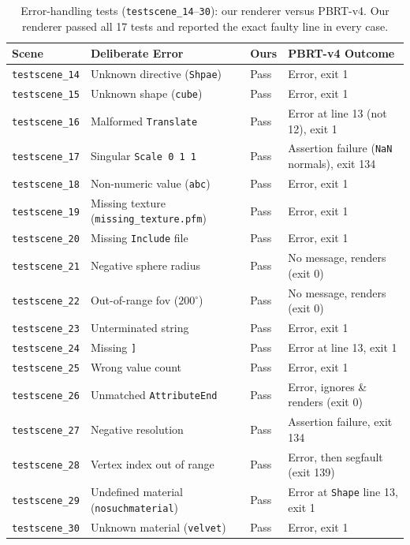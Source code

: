 \documentclass{article}
\begin{document}
\begin{table}[htbp]
\centering
\caption{Error-handling tests (\texttt{testscene\_14}--\texttt{30}): our renderer versus PBRT-v4. Our renderer passed all 17 tests and reported the exact faulty line in every case.}
\label{tab:error_tests}
\footnotesize
\renewcommand{\arraystretch}{1.12}
\setlength{\tabcolsep}{4pt}
\begin{tabularx}{\textwidth}{@{}l >{\hsize}L l >{\hsize}L@{}}
\toprule
\textbf{Scene} & \textbf{Deliberate Error} & \textbf{Ours} & \textbf{PBRT-v4 Outcome} \\
\midrule
\texttt{testscene\_14} & Unknown directive (\texttt{Shpae}) & Pass & Error, exit 1 \\
\texttt{testscene\_15} & Unknown shape (\texttt{cube}) & Pass & Error, exit 1 \\
\texttt{testscene\_16} & Malformed \texttt{Translate} & Pass & Error at line 13 (not 12), exit 1 \\
\texttt{testscene\_17} & Singular \texttt{Scale 0 1 1} & Pass & Assertion failure (\texttt{NaN} normals), exit 134 \\
\texttt{testscene\_18} & Non-numeric value (\texttt{abc}) & Pass & Error, exit 1 \\
\texttt{testscene\_19} & Missing texture (\texttt{missing\_texture.pfm}) & Pass & Error, exit 1 \\
\texttt{testscene\_20} & Missing \texttt{Include} file & Pass & Error, exit 1 \\
\texttt{testscene\_21} & Negative sphere radius & Pass & No message, renders (exit 0) \\
\texttt{testscene\_22} & Out-of-range fov ($200^\circ$) & Pass & No message, renders (exit 0) \\
\texttt{testscene\_23} & Unterminated string & Pass & Error, exit 1 \\
\texttt{testscene\_24} & Missing \texttt{]} & Pass & Error at line 13, exit 1 \\
\texttt{testscene\_25} & Wrong value count & Pass & Error, exit 1 \\
\texttt{testscene\_26} & Unmatched \texttt{AttributeEnd} & Pass & Error, ignores \& renders (exit 0) \\
\texttt{testscene\_27} & Negative resolution & Pass & Assertion failure, exit 134 \\
\texttt{testscene\_28} & Vertex index out of range & Pass & Error, then segfault (exit 139) \\
\texttt{testscene\_29} & Undefined material (\texttt{nosuchmaterial}) & Pass & Error at \texttt{Shape} line 13, exit 1 \\
\texttt{testscene\_30} & Unknown material (\texttt{velvet}) & Pass & Error, exit 1 \\
\bottomrule
\end{tabularx}
\end{table}
\end{document}
